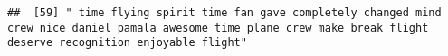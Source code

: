 \documentclass[
]{article}
\begin{document}
\begin{verbatim}
##  [59] " time flying spirit time fan gave completely changed mind crew nice daniel pamala awesome time plane crew make break flight deserve recognition enjoyable flight"                                                                                                                                                                                                                                                                                                                                                                                                                                                                                                                                                                                                                                                                                                                                                                                                                                                                                                                                                                                                                                                                                                                                                                                                                                                                                                                                                                                                                                                                                                                                                                                                                              

\end{verbatim}
\end{document}
